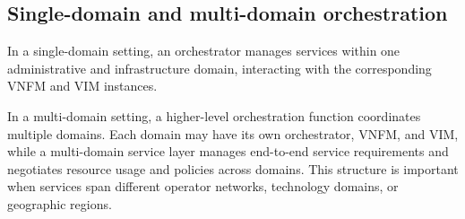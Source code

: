 \documentclass[11pt,a4paper,openany]{report}
\begin{document}
\subsection{Single-domain and multi-domain orchestration}

In a single-domain setting, an orchestrator manages services within one administrative and infrastructure domain, interacting with the corresponding VNFM and VIM instances.

In a multi-domain setting, a higher-level orchestration function coordinates multiple domains. Each domain may have its own orchestrator, VNFM, and VIM, while a multi-domain service layer manages end-to-end service requirements and negotiates resource usage and policies across domains. This structure is important when services span different operator networks, technology domains, or geographic regions.
\end{document}
